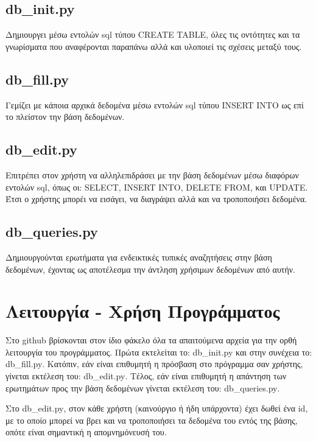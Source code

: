 \documentclass[manuscript,screen,review]{acmart}
\newcommand{\en}[1]{\foreignlanguage{english}{#1}}
\begin{document}
\subsection{\en{db\_init.py}}

Δημιουργει μέσω εντολών \en{sql} τύπου \en{CREATE TABLE}, όλες τις οντότητες και τα γνωρίσματα 
που αναφέρονται παραπάνω αλλά και υλοποιεί τις σχέσεις μεταξύ τους.

\subsection{\en{db\_fill.py}}

Γεμίζει με κάποια αρχικά δεδομένα μέσω εντολών \en{sql} τύπου \en{INSERT INTO} ως επί το πλείστον
την βάση δεδομένων.

\subsection{\en{db\_edit.py}}

Επιτρέπει στον χρήστη να αλληλεπιδράσει με την βάση δεδομένων μέσω διαφόρων εντολών \en{sql}, όπως
οι: \en{SELECT}, \en{INSERT INTO}, \en{DELETE FROM}, και \en{UPDATE}. Έτσι ο χρήστης μπορέι να εισάγει, 
να διαγράψει αλλά και να τροποποιήσει δεδομένα.

\subsection{\en{db\_queries.py}}

Δημιουργούνται ερωτήματα για ενδεικτικές τυπικές αναζητήσεις στην βάση δεδομένων, έχοντας ως 
αποτέλεσμα την άντληση χρήσιμων δεδομένων από αυτήν.

\section{Λειτουργία - Χρήση Προγράμματος}


Στο \en{github} βρίσκονται στον ίδιο φάκελο όλα τα απαιτούμενα αρχεία για την ορθή λειτουργία του 
προγράμματος. Πρώτα εκτελείται το: \en{db\_init.py} και στην συνέχεια το: \en{db\_fill.py}.
Κατόπιν, εάν είναι επιθυμητή η πρόσβαση στο πρόγραμμα σαν χρήστης, γίνεται εκτέλεση του:
\en{db\_edit.py}. Τέλος, εάν είναι επιθυμητή η απάντηση των ερωτημάτων προς την βάση δεδομένων
γίνεται εκτέλεση του: \en{db\_queries.py}.

Στο \en{db\_edit.py}, στον κάθε χρήστη (καινούργιο ή ήδη υπάρχοντα) έχει δωθεί ένα \en{id}, με το 
οποίο μπορεί να βρει και να τροποποιήσει τα δεδομένα του εντός της βάσης, οπότε είναι σημαντική
η απομνημόνευσή του.
\end{document}
